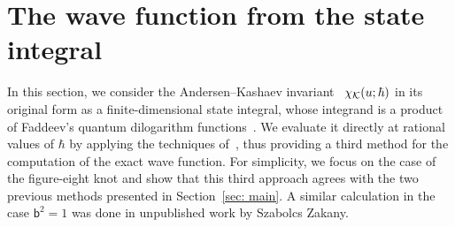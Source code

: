 \documentclass[a4paper,11pt]{article}
\theoremstyle{definition}
\newcommand{\CK}{{\cal K}}
\newcommand{\mb}{{\mathsf{b}}}
\begin{document}
\section{The wave function from the state integral} \label{sec: stateintegral}
In this section, we consider the Andersen--Kashaev invariant~\cite{ak, ak2, dimofte-rev} $\chi_{\CK}(u;\hbar)$ in its original form as a finite-dimensional state integral, whose integrand is a product of Faddeev’s quantum dilogarithm functions~\cite{faddeev}. We evaluate it directly at rational values of $\hbar$ by applying the techniques of~\cite{garou-kas}, thus providing a third method for the computation of the exact wave function. For simplicity, we focus on the case of the figure-eight knot and show that this third approach agrees with the two previous methods presented in Section~\ref{sec: main}. 
A similar calculation in the case $\mb^2=1$ was done in unpublished work by Szabolcs Zakany. 
\end{document}
